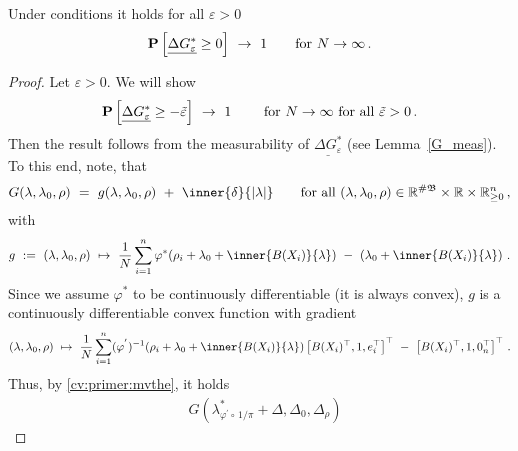  \begin{lemma}
   \label{bw:cd:lem2}
   Under conditions it holds
   for all $\varepsilon>0$
\begin{gather}
   \P
   \left[ 
     \underline{
     \Delta G^*
     _\varepsilon
     }
     \ge 
     0
   \right]
   \ 
   \to
   \ 
   1
   \qquad
   \text{for}
   \ 
   N\to\infty
   \,.
\end{gather}
 \end{lemma}
 \begin{proof}
   Let $\varepsilon>0$.
   We will show
\begin{gather}
   \P
   \left[ 
     \underline{
     \Delta G^*
     _\varepsilon
     }
     \ge 
     -\tilde{\varepsilon}
   \right]
   \ 
   \to
   \ 
   1
   \qquad
   \ 
   \text{for}
   \ 
   N\to\infty
   \ 
   \text{for all}\ 
   \tilde{\varepsilon}>0
   \,.
\end{gather}
Then the result follows from the measurability of 
$
     \underline{
     \Delta G^*
     _\varepsilon
     }
$
(see Lemma~\ref{G_meas}).
To this end, note, that
\begin{gather*}
  G(\lambda,\lambda_0,\rho)
  \ 
  =
  \ 
  g(\lambda,\lambda_0,\rho)
  \ 
  +
  \ 
  \inner{\delta}{|\lambda|}
  \qquad
  \text{for all}\ 
  (\lambda,\lambda_0,\rho)
  \in
  \R^{\#\mathfrak{B}}
  \times
  \R
  \times
  \R^n_{\ge 0}
  \,,
\end{gather*}
with
\begin{gather*}
  g
  \ 
  :=
  \ 
  (\lambda,\lambda_0,\rho)
  \ 
  \mapsto
  \ 
     \frac{1}{N}
\sum_{i=1} 
  ^n
  \varphi^*
  \!
  \left( 
    \rho_i
    +
\lambda_0
+
\inner
{B(X_i)}
{
\lambda
}
  \right)
  \ 
  -
  \ 
  \left( 
\lambda_0
+
\inner
{B(X_i)}
{
\lambda
}
  \right)
  \,.
\end{gather*}
Since we assume $\varphi^*$ to be continuously differentiable (it is always convex),
$g$ is a continuously differentiable convex function with gradient
\begin{gather*}
  (\lambda,\lambda_0,\rho)
  \ 
  \mapsto
  \ 
     \frac{1}{N}
\sum_{i=1} 
  ^n
  (
  \varphi^{'}
  )
  ^{-1}
  \!
  \left( 
    \rho_i
    +
\lambda_0
+
\inner
{B(X_i)}
{
\lambda
}
  \right)
  \left[ 
    B(X_i)^\top,1,e_i^\top
  \right]^\top
  \ 
  -
  \ 
  \left[ 
    B(X_i)^\top,1,0_n^\top
  \right]^\top
  \,.
\end{gather*}
Thus, by \eqref{cv:primer:mvthe},
it holds
\begin{align*}
  &
  G
   \left( 
\lambda^*_{\varphi^{'}\circ\,1/\pi}
+\Delta
,
\Delta_0
,
\Delta_\rho
   \right)

\end{align*}
\end{proof}
